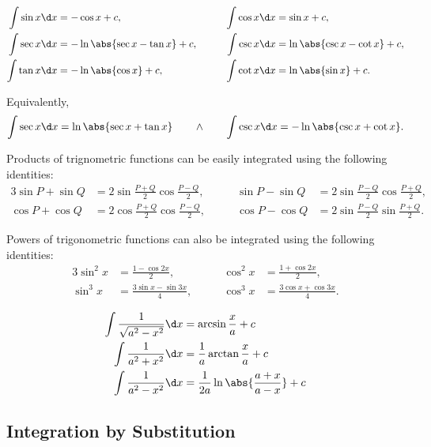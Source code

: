 \begin{proposition}
    \begin{alignat*}{3}
        \int \sin x \d x &= -\cos x + c, \qquad & \int \cos x \d x &= \sin x + c,\\
        \int \sec x \d x &= -\ln \abs{\sec x - \tan x} + c, \qquad & \int \csc x \d x &= \ln \abs{\csc x - \cot x} + c,\\
        \int \tan x \d x &= -\ln \abs{\cos x} + c, \qquad & \int \cot x \d x &= \ln \abs{\sin x} + c.
    \end{alignat*}
\end{proposition}

Equivalently, \[\int \sec x \d x = \ln \abs{\sec x + \tan x} \qquad \land \qquad \int \csc x \d x = -\ln \abs{\csc x + \cot x}.\]

Products of trignometric functions can be easily integrated using the following identities:
\begin{alignat*}{3}
    \sin P + \sin Q &= 2 \sin \frac{P + Q}{2} \cos \frac{P - Q}{2}, \qquad & \sin P - \sin Q &= 2 \sin \frac{P - Q}{2} \cos \frac{P + Q}{2},\\
    \cos P + \cos Q &= 2 \cos \frac{P + Q}{2} \cos \frac{P - Q}{2}, \qquad & \cos P - \cos Q &= 2 \sin \frac{P - Q}{2} \sin \frac{P + Q}{2}.
\end{alignat*}

Powers of trigonometric functions can also be integrated using the following identities:
\begin{alignat*}{3}
    \sin^2 x &= \frac{1 - \cos 2x}{2}, \qquad & \cos^2 x &= \frac{1 + \cos 2x}{2},\\
    \sin^3 x &= \frac{3\sin x - \sin 3x}{4}, \qquad & \cos^3 x &= \frac{3\cos x + \cos 3x}{4}.
\end{alignat*}

\begin{proposition}
    \begin{align*}
        \int \frac1{\sqrt{a^2 - x^2}} \d x &= \arcsin \frac{x}{a} + c\\
        \int \frac1{a^2 + x^2} \d x &= \frac1{a} \arctan \frac{x}{a} + c\\
        \int \frac1{a^2 - x^2} \d x &= \frac1{2a} \ln \abs{\frac{a + x}{a-x}} + c
    \end{align*}
\end{proposition}

\subsection{Integration by Substitution}

